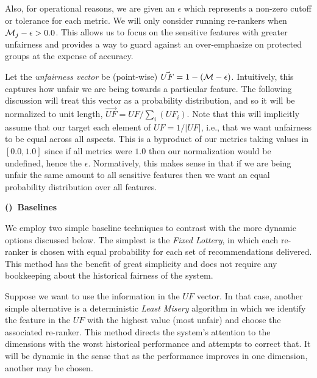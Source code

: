 Also, for operational reasons, we are given an $\epsilon$ which represents a non-zero cutoff or tolerance for each metric.  We will only consider running re-rankers when $\mathcal{M}_j - \epsilon > 0.0$. This allows us to focus on the sensitive features with greater unfairness and provides a way to guard against an over-emphasize on protected groups at the expense of accuracy.

Let the \emph{unfairness vector} be (point-wise) $\vec{UF} = 1 - (\mathcal{M} - \epsilon)$.  Intuitively, this captures how unfair we are being towards a particular feature.  The following discussion will treat this vector as a probability distribution, and so it will be normalized to unit length, $\vec{UF} = UF / \sum_i(UF_i)$. Note that this will implicitly assume that our target each element of $UF = 1/|UF|$, i.e., that we want unfairness to be equal across all aspects.  This is a byproduct of our metrics taking values in $[0.0,1.0]$ since if all metrics were $1.0$ then our normalization would be undefined, hence the $\epsilon$.  Normatively, this makes sense in that if we are being unfair the same amount to all sensitive features then we want an equal probability distribution over all features.

\vspace{0.25cm}
\noindent \textbf{()~Baselines}
\vspace{0.25cm}

We employ two simple baseline techniques to contrast with the more dynamic options discussed below. The simplest is the \textit{Fixed Lottery}, in which each re-ranker is chosen with equal probability for each set of recommendations delivered. This method has the benefit of great simplicity and does not require any bookkeeping about the historical fairness of the system. 

Suppose we want to use the information in the $UF$ vector. In that case, another simple alternative is a deterministic \textit{Least Misery} algorithm in which we identify the feature in the $UF$ with the highest value (most unfair) and choose the associated re-ranker. This method directs the system's attention to the dimensions with the worst historical performance and attempts to correct that. It will be dynamic in the sense that as the performance improves in one dimension, another may be chosen.

